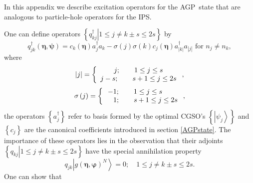 \documentclass[titlepage]{article}%
\begin{document}
In this appendix we describe excitation operators for the AGP\ state that are
analogous to particle-hole operators for the IPS.

One can define operators $\left\{  \left.  q_{kj}^{\dagger}\right\vert 1\leq
j\neq k\pm s\leq2s\right\}  $ by
\begin{equation}
q_{jk}^{\dagger}\left(  \bm{\eta,\psi}\right)  =c_{k}\left(
\bm{\eta }\right)  a_{j}^{\dagger}a_{k}-\sigma\left(  j\right)  \sigma\left(
k\right)  c_{j}\left(  \bm{\eta}\right)  a_{\left\vert k\right\vert }%
^{\dagger}a_{\left\vert j\right\vert }\text{ for }n_{j}\neq n_{k},
\end{equation}
where%
\begin{equation}
\left\vert j\right\vert =\left\{
\begin{array}
[c]{c}%
j;\qquad1\leq j\leq s\\
j-s;\qquad s+1\leq j\leq2s
\end{array}
\right.  ,
\end{equation}%
\begin{equation}
\sigma\left(  j\right)  =\left\{
\begin{array}
[c]{c}%
-1;\qquad1\leq j\leq s\quad\quad\\
\quad1;\qquad s+1\leq j\leq2s
\end{array}
\right.  ,
\end{equation}
the operators $\left\{  a_{j}^{\dagger}\right\}  $ refer to basis formed by
the optimal CGSO's $\left\{  \left\vert \psi_{j}\right\rangle \right\}  $ and
$\left\{  c_{j}\right\}  $ are the canonical coefficients introduced in
section \ref{AGPstate}. The importance of these operators lies in the
observation that their adjoints $\left\{  \left.  q_{kj}\right\vert 1\leq
j\neq k\pm s\leq2s\right\}  $ have the special annihilation property%
\begin{equation}
q_{jk}\left\vert g\left(  \bm{\eta},\bm{\varphi}\right)  ^{N}\right\rangle
=0;\quad1\leq j\neq k\pm s\leq2s.
\end{equation}
One can show \cite{Goscinski82a} that
\end{document}
